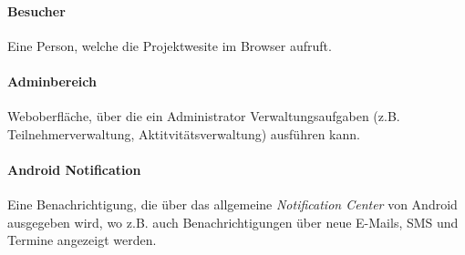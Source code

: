 \documentclass[10pt,a4paper]{article}
\begin{document}
\paragraph{Besucher} Eine Person, welche die Projektwesite im Browser aufruft.

\paragraph{Adminbereich} Weboberfläche, über die ein Administrator Verwaltungsaufgaben (z.B. Teilnehmerverwaltung, Aktitvitätsverwaltung) ausführen kann.

\paragraph{Android Notification} Eine Benachrichtigung, die über das allgemeine \emph{Notification Center} von Android ausgegeben wird, wo z.B. auch Benachrichtigungen über neue E-Mails, SMS und Termine angezeigt werden.
\end{document}
